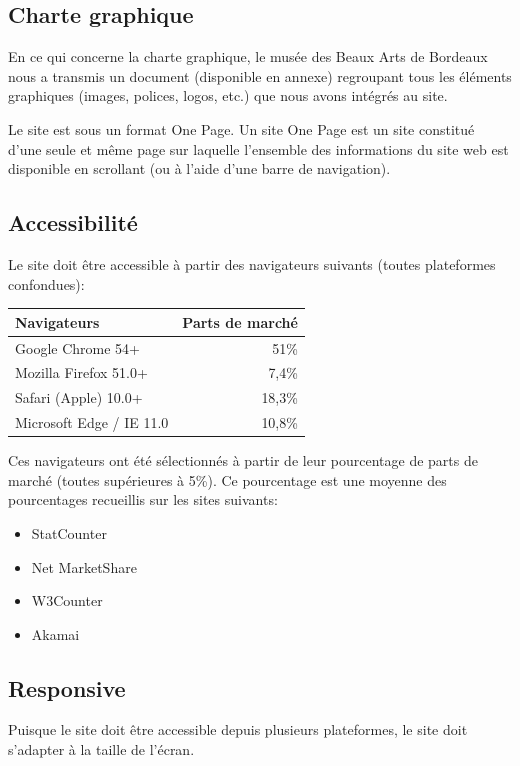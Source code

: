 \documentclass[11pt]{report}
\begin{document}
\subsection*{Charte graphique}

En ce qui concerne la charte graphique, le musée des Beaux Arts de Bordeaux nous a transmis un document (disponible en annexe) regroupant tous les éléments graphiques (images, polices, logos, etc.) que nous avons intégrés au site.

Le site est sous un format One Page. Un site One Page est un site constitué
d'une seule et même page sur laquelle l'ensemble des informations du site web
est disponible en scrollant (ou à l'aide d'une barre de navigation).

\subsection*{Accessibilité}

Le site doit être accessible à partir des navigateurs suivants (toutes plateformes confondues):
\begin{center}
	\begin{tabular}{|l | r|}
		\hline
		Navigateurs & Parts de marché \\
		\hline
		\hline
		Google Chrome 54+ & 51\% \\
		\hline
		Mozilla Firefox 51.0+ & 7,4\% \\
		\hline
		Safari (Apple) 10.0+ & 18,3\% \\
		\hline
		Microsoft Edge / IE 11.0 & 10,8\% \\
		\hline
	\end{tabular}
\end{center}
Ces navigateurs ont été sélectionnés à partir de leur pourcentage de parts de marché (toutes supérieures à 5\%). Ce pourcentage est une moyenne des pourcentages recueillis sur les sites suivants:
\begin{itemize}
	\item StatCounter
	\item Net MarketShare
	\item W3Counter
	\item Akamai
\end{itemize}

\subsection*{Responsive}
Puisque le site doit être accessible depuis plusieurs plateformes, le site doit s'adapter à la taille de l'écran.
\end{document}
